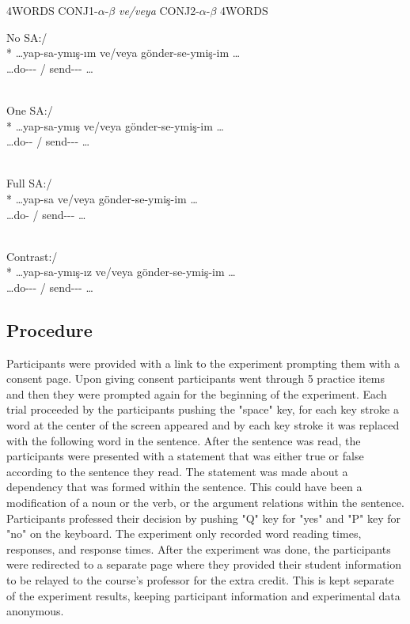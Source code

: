 \begin{exe}
\ex \label{selfpacedtemplate}
4WORDS CONJ1-$\alpha$-$\beta$ \textit{ve/veya} CONJ2-$\alpha$-$\beta$ 4WORDS

\ex \label{selfpacedexamples}
    \begin{xlist}
  \ex No SA:{\And}/{\Or}\\* 
  \gll \ldots yap-sa-ymış-ım ve/veya gönder-se-ymiş-im \ldots \\ 
  \ldots do-{\Cond}-{\Prf}-{\Fsg} {\And}/{\Or} send-{\Cond}-{\Prf}-{\Fsg} \ldots \\
  \glt ${}$

  \ex One SA:{\And}/{\Or}\\*
  \gll \ldots yap-sa-ymış ve/veya gönder-se-ymiş-im \ldots \\ 
  \ldots do-{\Cond}-{\Prf} {\And}/{\Or} send-{\Cond}-{\Prf}-{\Fsg} \ldots \\
  \glt ${}$
  
  \ex Full SA:{\And}/{\Or}\\*
  \gll \ldots yap-sa ve/veya gönder-se-ymiş-im \ldots \\ 
  \ldots do-{\Cond} {\And}/{\Or} send-{\Cond}-{\Prf}-{\Fsg} \ldots \\
  \glt ${}$
  
  \ex Contrast:{\And}/{\Or}\\*
  \gll \ldots yap-sa-ymış-ız ve/veya gönder-se-ymiş-im \ldots \\ 
  \ldots do-{\Cond}-{\Prf}-{\Fpl} {\And}/{\Or} send-{\Cond}-{\Prf}-{\Fsg} \ldots \\
    \end{xlist}
\end{exe}


\subsection{Procedure}

Participants were provided with a link to the experiment prompting them with a consent page. Upon giving consent participants went through 5 practice items and then they were prompted again for the beginning of the experiment. Each trial proceeded by the participants pushing the "space" key, for each key stroke a word at the center of the screen appeared and by each key stroke it was replaced with the following word in the sentence. After the sentence was read, the participants were presented with a statement that was either true or false according to the sentence they read. The statement was made about a dependency that was formed within the sentence. This could have been a modification of a noun or the verb, or the argument relations within the sentence. Participants professed their decision by pushing "Q" key for "yes" and "P" key for "no" on the keyboard. The experiment only recorded word reading times, responses, and response times. After the experiment was done, the participants were redirected to a separate page where they provided their student information to be relayed to the course's professor for the extra credit. This is kept separate of the experiment results, keeping participant information and experimental data anonymous.

